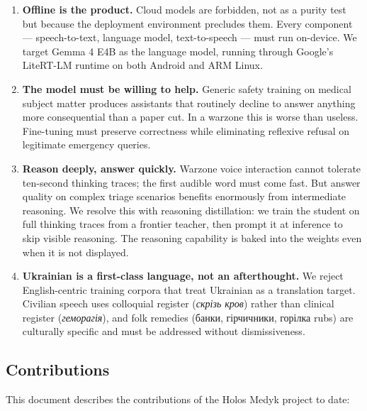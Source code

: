 \documentclass{article}
\theoremstyle{plain}
\theoremstyle{definition}
\theoremstyle{remark}
\begin{document}
\begin{enumerate}
\item \textbf{Offline is the product.} Cloud models are forbidden, not as a purity test but because the deployment environment precludes them. Every component --- speech-to-text, language model, text-to-speech --- must run on-device. We target Gemma 4 E4B as the language model, running through Google's LiteRT-LM runtime on both Android and ARM Linux.
\item \textbf{The model must be willing to help.} Generic safety training on medical subject matter produces assistants that routinely decline to answer anything more consequential than a paper cut. In a warzone this is worse than useless. Fine-tuning must preserve correctness while eliminating reflexive refusal on legitimate emergency queries.
\item \textbf{Reason deeply, answer quickly.} Warzone voice interaction cannot tolerate ten-second thinking traces; the first audible word must come fast. But answer quality on complex triage scenarios benefits enormously from intermediate reasoning. We resolve this with reasoning distillation: we train the student on full thinking traces from a frontier teacher, then prompt it at inference to skip visible reasoning. The reasoning capability is baked into the weights even when it is not displayed.
\item \textbf{Ukrainian is a first-class language, not an afterthought.} We reject English-centric training corpora that treat Ukrainian as a translation target. Civilian speech uses colloquial register (\emph{скрізь кров}) rather than clinical register (\emph{геморагія}), and folk remedies (банки, гірчичники, горілка rubs) are culturally specific and must be addressed without dismissiveness.
\end{enumerate}

\subsection{Contributions}

This document describes the contributions of the Holos Medyk project to date:
\end{document}
